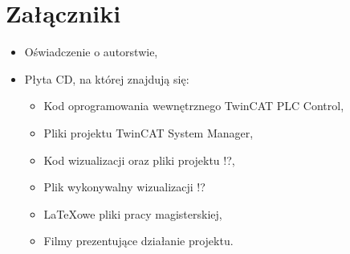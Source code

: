 \section{Załączniki}
\begin{itemize}
\item Oświadczenie o autorstwie,
\item Płyta CD, na której znajdują się:
\begin{itemize}
\item Kod oprogramowania wewnętrznego TwinCAT PLC Control,
\item Pliki projektu TwinCAT System Manager,
\item Kod wizualizacji oraz pliki projektu !?,
\item Plik wykonywalny wizualizacji !?
\item LaTeXowe pliki pracy magisterskiej,
\item Filmy prezentujące działanie projektu.
\end{itemize}
\end{itemize}
